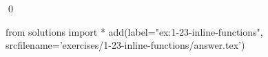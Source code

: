 
\begin{ex}
  \label{ex:1-23-inline-functions}
  
  \qed
\end{ex}
\begin{python0}
from solutions import *
add(label="ex:1-23-inline-functions",
    srcfilename='exercises/1-23-inline-functions/answer.tex')
\end{python0}
